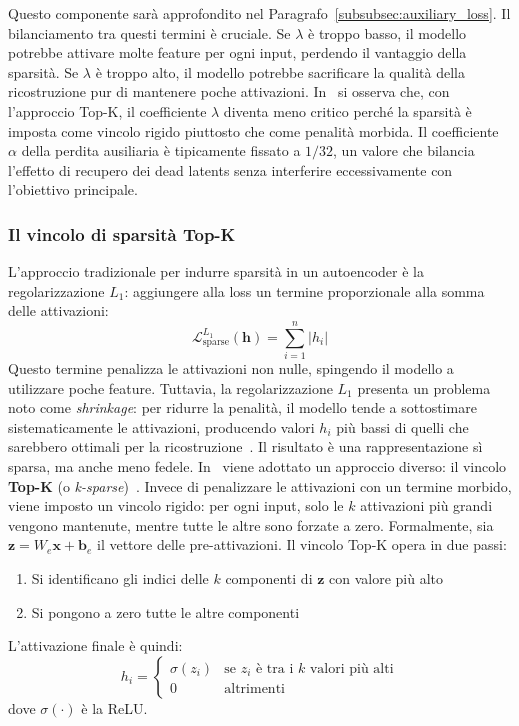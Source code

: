 Questo componente sarà approfondito nel Paragrafo~\ref{subsubsec:auxiliary_loss}. Il bilanciamento tra questi termini è cruciale. Se $\lambda$ è troppo basso, il modello potrebbe attivare molte feature per ogni input, perdendo il vantaggio della sparsità. Se $\lambda$ è troppo alto, il modello potrebbe sacrificare la qualità della ricostruzione pur di mantenere poche attivazioni. In~\parencite{oneill2024disentangling} si osserva che, con l'approccio Top-K, il coefficiente $\lambda$ diventa meno critico perché la sparsità è imposta come vincolo rigido piuttosto che come penalità morbida. Il coefficiente $\alpha$ della perdita ausiliaria è tipicamente fissato a $1/32$, un valore che bilancia l'effetto di recupero dei dead latents senza interferire eccessivamente con l'obiettivo principale.
\subsubsection{Il vincolo di sparsità Top-K}
\label{subsubsec:topk_sparsity}

L'approccio tradizionale per indurre sparsità in un autoencoder è la regolarizzazione $L_1$: aggiungere alla loss un termine proporzionale alla somma delle attivazioni:
\begin{equation}
    \mathcal{L}_{\text{sparse}}^{L_1}(\mathbf{h}) = \sum_{i=1}^{n} |h_i|
\end{equation}
Questo termine penalizza le attivazioni non nulle, spingendo il modello a utilizzare poche feature. Tuttavia, la regolarizzazione $L_1$ presenta un problema noto come \textit{shrinkage}: per ridurre la penalità, il modello tende a sottostimare sistematicamente le attivazioni, producendo valori $h_i$ più bassi di quelli che sarebbero ottimali per la ricostruzione~\parencite{oneill2024disentangling}. Il risultato è una rappresentazione sì sparsa, ma anche meno fedele.
In~\parencite{oneill2024disentangling} viene adottato un approccio diverso: il vincolo \textbf{Top-K} (o \textit{k-sparse})~\parencite{makhzani2013ksparse}. Invece di penalizzare le attivazioni con un termine morbido, viene imposto un vincolo rigido: per ogni input, solo le $k$ attivazioni più grandi vengono mantenute, mentre tutte le altre sono forzate a zero.
Formalmente, sia $\mathbf{z} = W_e \mathbf{x} + \mathbf{b}_e$ il vettore delle pre-attivazioni. Il vincolo Top-K opera in due passi:
\begin{enumerate}
    \item Si identificano gli indici delle $k$ componenti di $\mathbf{z}$ con valore più alto
    \item Si pongono a zero tutte le altre componenti
\end{enumerate}
L'attivazione finale è quindi:
\begin{equation}
    h_i = \begin{cases}
        \sigma(z_i) & \text{se } z_i \text{ è tra i } k \text{ valori più alti} \\
        0 & \text{altrimenti}
    \end{cases}
    \label{eq:topk_activation}
\end{equation}
dove $\sigma(\cdot)$ è la ReLU.

